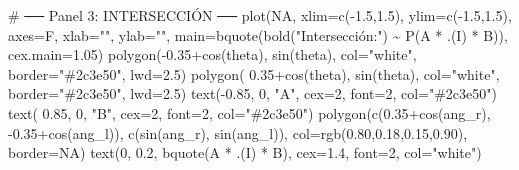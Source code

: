 \documentclass[
  letterpaper,
  DIV=11,
  numbers=noendperiod]{scrartcl}
\newenvironment{Shaded}{\begin{snugshade}}{\end{snugshade}}
\newcommand{\AttributeTok}[1]{\textcolor[rgb]{0.40,0.45,0.13}{#1}}
\newcommand{\CommentTok}[1]{\textcolor[rgb]{0.37,0.37,0.37}{#1}}
\newcommand{\ConstantTok}[1]{\textcolor[rgb]{0.56,0.35,0.01}{#1}}
\newcommand{\DecValTok}[1]{\textcolor[rgb]{0.68,0.00,0.00}{#1}}
\newcommand{\FloatTok}[1]{\textcolor[rgb]{0.68,0.00,0.00}{#1}}
\newcommand{\FunctionTok}[1]{\textcolor[rgb]{0.28,0.35,0.67}{#1}}
\newcommand{\NormalTok}[1]{\textcolor[rgb]{0.00,0.23,0.31}{#1}}
\newcommand{\SpecialCharTok}[1]{\textcolor[rgb]{0.37,0.37,0.37}{#1}}
\newcommand{\StringTok}[1]{\textcolor[rgb]{0.13,0.47,0.30}{#1}}
\begin{document}
\begin{Shaded}
\begin{Highlighting}[]
\CommentTok{\# ── Panel 3: INTERSECCIÓN ──}
\FunctionTok{plot}\NormalTok{(}\ConstantTok{NA}\NormalTok{, }\AttributeTok{xlim=}\FunctionTok{c}\NormalTok{(}\SpecialCharTok{{-}}\FloatTok{1.5}\NormalTok{,}\FloatTok{1.5}\NormalTok{), }\AttributeTok{ylim=}\FunctionTok{c}\NormalTok{(}\SpecialCharTok{{-}}\FloatTok{1.5}\NormalTok{,}\FloatTok{1.5}\NormalTok{), }\AttributeTok{axes=}\NormalTok{F, }\AttributeTok{xlab=}\StringTok{""}\NormalTok{, }\AttributeTok{ylab=}\StringTok{""}\NormalTok{,}
     \AttributeTok{main=}\FunctionTok{bquote}\NormalTok{(}\FunctionTok{bold}\NormalTok{(}\StringTok{"Intersección:"}\NormalTok{) }\SpecialCharTok{\textasciitilde{}} \FunctionTok{P}\NormalTok{(A }\SpecialCharTok{*}\NormalTok{ .(I) }\SpecialCharTok{*}\NormalTok{ B)),}
     \AttributeTok{cex.main=}\FloatTok{1.05}\NormalTok{)}
\FunctionTok{polygon}\NormalTok{(}\SpecialCharTok{{-}}\FloatTok{0.35}\SpecialCharTok{+}\FunctionTok{cos}\NormalTok{(theta), }\FunctionTok{sin}\NormalTok{(theta), }\AttributeTok{col=}\StringTok{"white"}\NormalTok{, }\AttributeTok{border=}\StringTok{"\#2c3e50"}\NormalTok{, }\AttributeTok{lwd=}\FloatTok{2.5}\NormalTok{)}
\FunctionTok{polygon}\NormalTok{( }\FloatTok{0.35}\SpecialCharTok{+}\FunctionTok{cos}\NormalTok{(theta), }\FunctionTok{sin}\NormalTok{(theta), }\AttributeTok{col=}\StringTok{"white"}\NormalTok{, }\AttributeTok{border=}\StringTok{"\#2c3e50"}\NormalTok{, }\AttributeTok{lwd=}\FloatTok{2.5}\NormalTok{)}
\FunctionTok{text}\NormalTok{(}\SpecialCharTok{{-}}\FloatTok{0.85}\NormalTok{, }\DecValTok{0}\NormalTok{, }\StringTok{"A"}\NormalTok{, }\AttributeTok{cex=}\DecValTok{2}\NormalTok{, }\AttributeTok{font=}\DecValTok{2}\NormalTok{, }\AttributeTok{col=}\StringTok{"\#2c3e50"}\NormalTok{)}
\FunctionTok{text}\NormalTok{( }\FloatTok{0.85}\NormalTok{, }\DecValTok{0}\NormalTok{, }\StringTok{"B"}\NormalTok{, }\AttributeTok{cex=}\DecValTok{2}\NormalTok{, }\AttributeTok{font=}\DecValTok{2}\NormalTok{, }\AttributeTok{col=}\StringTok{"\#2c3e50"}\NormalTok{)}
\FunctionTok{polygon}\NormalTok{(}\FunctionTok{c}\NormalTok{(}\FloatTok{0.35}\SpecialCharTok{+}\FunctionTok{cos}\NormalTok{(ang\_r), }\SpecialCharTok{{-}}\FloatTok{0.35}\SpecialCharTok{+}\FunctionTok{cos}\NormalTok{(ang\_l)),}
        \FunctionTok{c}\NormalTok{(}\FunctionTok{sin}\NormalTok{(ang\_r), }\FunctionTok{sin}\NormalTok{(ang\_l)),}
        \AttributeTok{col=}\FunctionTok{rgb}\NormalTok{(}\FloatTok{0.80}\NormalTok{,}\FloatTok{0.18}\NormalTok{,}\FloatTok{0.15}\NormalTok{,}\FloatTok{0.90}\NormalTok{), }\AttributeTok{border=}\ConstantTok{NA}\NormalTok{)}
\FunctionTok{text}\NormalTok{(}\DecValTok{0}\NormalTok{, }\FloatTok{0.2}\NormalTok{, }\FunctionTok{bquote}\NormalTok{(A }\SpecialCharTok{*}\NormalTok{ .(I) }\SpecialCharTok{*}\NormalTok{ B), }\AttributeTok{cex=}\FloatTok{1.4}\NormalTok{, }\AttributeTok{font=}\DecValTok{2}\NormalTok{, }\AttributeTok{col=}\StringTok{"white"}\NormalTok{)}

\end{Highlighting}
\end{Shaded}
\end{document}
